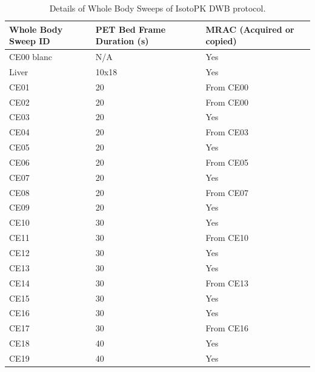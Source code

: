 \begin{table}[]
\centering
\label{tab:IsotPK_CE_details}
\caption{Details of Whole Body Sweeps of IsotoPK DWB protocol.}
\begin{tabular}{|l|l|l|}
\toprule
\textbf{Whole Body Sweep ID} & \textbf{PET Bed Frame Duration (s)}                   & \textbf{MRAC (Acquired or copied)} \\
\midrule
CE00 blanc          & {N/A}                                          & Yes  \\
Liver               & 10x18                                          & Yes  \\
CE01                & 20                                             & From CE00     \\
CE02                & 20                                             & From CE00     \\
CE03                & 20                                             & Yes           \\
CE04                & 20                                             & From CE03     \\
CE05                & 20                                             & Yes  \\
CE06                & 20                                             & From CE05     \\
CE07                & 20                                             & Yes  \\
CE08                & 20                                             & From CE07     \\
CE09                & 20                                             & Yes  \\
CE10                & 30                                             & Yes  \\
CE11                & 30                                             & From CE10     \\
CE12                & 30                                             & Yes  \\
CE13                & 30                                             & Yes  \\
CE14                & 30                                             & From CE13     \\
CE15                & 30                                             & Yes  \\
CE16                & 30                                             & Yes  \\
CE17                & 30                                             & From CE16     \\
CE18                & 40                                             & Yes  \\
CE19                & 40                                             & Yes  \\
\bottomrule
\end{tabular}
\end{table}

